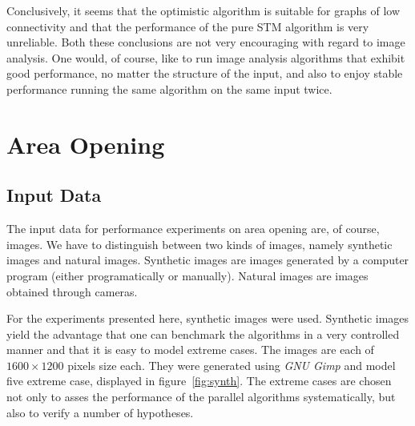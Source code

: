 Conclusively, it seems that the optimistic algorithm is suitable for graphs of
low connectivity and that the performance of the pure STM algorithm is very
unreliable. Both these conclusions are not very encouraging with regard to image
analysis. One would, of course, like to run image analysis algorithms that
exhibit good performance, no matter the structure of the input, and also to
enjoy stable performance running the same algorithm on the same input twice.

\section{Area Opening}
\label{sec:experiments-area-opening}

\subsection{Input Data}
\label{sec:experiments-ao-input-data}

The input data for performance experiments on area opening are, of course,
images. We have to distinguish between two kinds of images, namely synthetic
images and natural images. Synthetic images are images generated by a computer
program (either programatically or manually). Natural images are images obtained
through cameras.

For the experiments presented here, synthetic images were used. Synthetic images
yield the advantage that one can benchmark the algorithms in a very controlled
manner and that it is easy to model extreme cases. The images are each of $1600
\times 1200$ pixels size each. They were generated using \emph{GNU Gimp} and
model five extreme case, displayed in figure~\ref{fig:synth}. The extreme cases
are chosen not only to asses the performance of the parallel algorithms
systematically, but also to verify a number of hypotheses.

